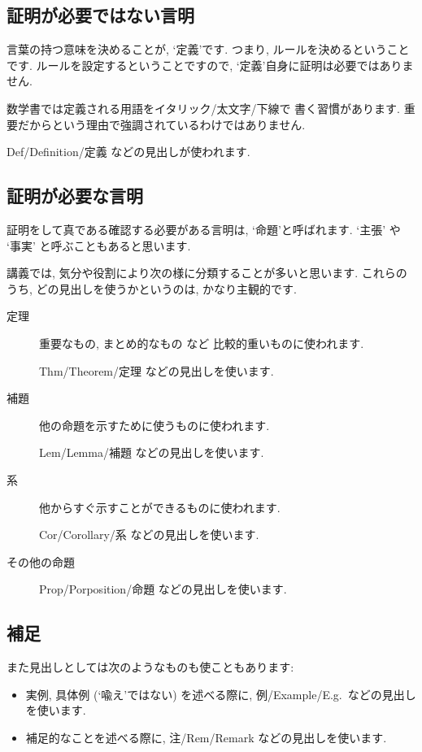 \subsection{証明が必要ではない言明}
言葉の持つ意味を決めることが,
`定義'です.
つまり, ルールを決めるということです.
ルールを設定するということですので,
`定義'自身に証明は必要ではありません.

数学書では定義される用語をイタリック/太文字/下線で
書く習慣があります.
重要だからという理由で強調されているわけではありません.

Def/Definition/定義 などの見出しが使われます.

\subsection{証明が必要な言明}
証明をして真である確認する必要がある言明は,
`命題'と呼ばれます.
`主張' や `事実' と呼ぶこともあると思います.

講義では, 
気分や役割により次の様に分類することが多いと思います.
これらのうち, どの見出しを使うかというのは, 
かなり主観的です.
\begin{description}
\item[定理]
重要なもの, まとめ的なもの など 比較的重いものに使われます.

Thm/Theorem/定理  などの見出しを使います.

\item[補題]
他の命題を示すために使うものに使われます.

Lem/Lemma/補題  などの見出しを使います.

\item[系]
他からすぐ示すことができるものに使われます.

Cor/Corollary/系  などの見出しを使います.
\item[その他の命題]

Prop/Porposition/命題  などの見出しを使います.
\end{description}

\subsection{補足}
また見出しとしては次のようなものも使こともあります:
\begin{itemize}
 \item 
実例, 具体例 (`喩え'ではない) を述べる際に,
例/Example/E.g.\   などの見出しを使います.
\item
補足的なことを述べる際に,
注/Rem/Remark   などの見出しを使います.
\end{itemize}


